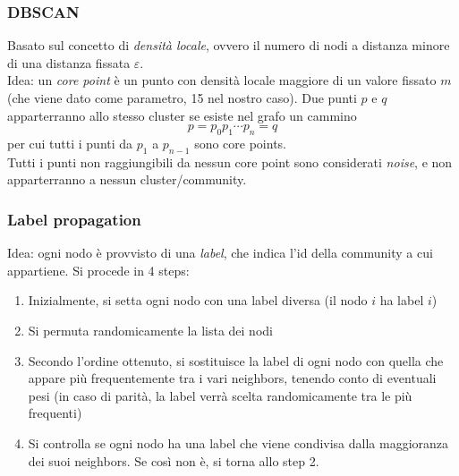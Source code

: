 \documentclass{beamer}
\begin{document}
\begin{frame}
\frametitle{DBSCAN}
Basato sul concetto di \textit{densit\`{a} locale}, ovvero il numero di nodi a distanza minore di una distanza fissata $\varepsilon$.\\
Idea: un \textit{core point} è un punto con densit\`{a} locale maggiore di un valore fissato $m$ (che viene dato come parametro, 15 nel nostro caso). Due punti $p$ e $q$ apparterranno allo stesso cluster se esiste nel grafo un cammino
$$
p = p_0 p_1\cdots p_n = q
$$
per cui tutti i punti da $p_1$ a $p_{n-1}$ sono core points.\\

Tutti i punti non raggiungibili da nessun core point sono considerati \textit{noise}, e non apparterranno a nessun cluster/community.
\end{frame}

\begin{frame}
\frametitle{Label propagation}
Idea: ogni nodo è provvisto di una \textit{label}, che indica l'id della community a cui appartiene. 
Si procede in 4 steps:
\begin{enumerate}
\item Inizialmente, si setta ogni nodo con una label diversa (il nodo $i$ ha label $i$)
\item Si permuta randomicamente la lista dei nodi
\item Secondo l'ordine ottenuto, si sostituisce la label di ogni nodo con quella che appare più frequentemente tra i vari neighbors, tenendo conto di eventuali pesi (in caso di parità, la label verrà scelta randomicamente tra le più frequenti)
\item Si controlla se ogni nodo ha una label che viene condivisa dalla maggioranza dei suoi neighbors. Se così non è, si torna allo step 2.
\end{enumerate}
\end{frame}
\end{document}
